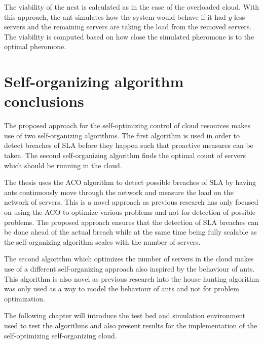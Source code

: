 The viability of the nest is calculated as in the case of the overloaded cloud. With this approach, the ant simulates how the system would behave if it had $y$ less servers and the remaining servers are taking the load from the removed servers. The viability is computed based on how close the simulated pheromone is to the optimal pheromone.

\section{Self-organizing algorithm conclusions}

The proposed approach for the self-optimizing control of cloud resources makes use of two self-organizing algorithms. The first algorithm is used in order to detect breaches of SLA before they happen such that proactive measures can be taken. The second self-organizing algorithm finds the optimal count of servers which should be running in the cloud.

The thesis uses the ACO algorithm to detect possible breaches of SLA by having ants continuously move through the network and measure the load on the network of servers. This is a novel approach as previous research has only focused on using the ACO to optimize various problems and not for detection of possible problems. The proposed approach ensures that the detection of SLA breaches can be done ahead of the actual breach while at the same time being fully scalable as the self-organizing algorithm scales with the number of servers.

The second algorithm which optimizes the number of servers in the cloud makes use of a different self-organizing approach also inspired by the behaviour of ants. This algorithm is also novel as previous research into the house hunting algorithm was only used as a way to model the behaviour of ants and not for problem optimization.

The following chapter will introduce the test bed and simulation environment used to test the algorithms and also present results for the implementation of the self-optimizing self-organizing cloud.
